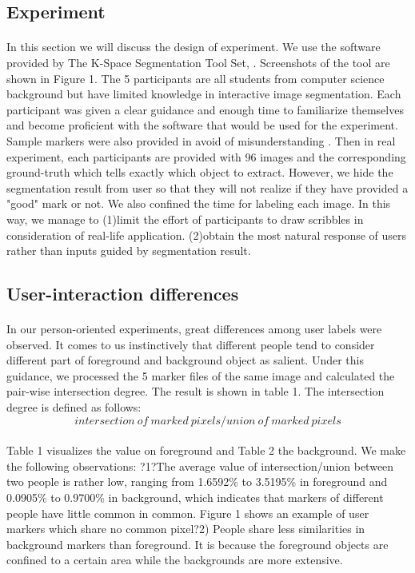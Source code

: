 \documentclass[runningheads,a4paper]{llncs}
\begin{document}
\subsection{Experiment}
\paragraph{}In this section we will discuss the design of experiment. We use the software provided by The K-Space Segmentation Tool Set, \citep{mcguinness2008k}. Screenshots of the tool are shown in Figure 1. The 5 participants are all students from computer science background but have limited knowledge in interactive image segmentation. Each participant was given a clear guidance and enough time to familiarize themselves and become proficient with the software that would be used for the experiment. Sample markers were also provided in avoid of misunderstanding . Then in real experiment, each participants are provided with 96 images and the corresponding ground-truth which tells exactly which object to extract. However, we hide the segmentation result from user so that they will not realize if they have provided a "good" mark or not. We also confined the time for labeling each image. In this way, we manage to (1)limit the effort of participants to draw scribbles in consideration of real-life application.
(2)obtain the most natural response of users rather than inputs guided by segmentation result.
\paragraph{}

\subsection{User-interaction differences}
 \paragraph{}In our person-oriented experiments, great differences among user labels were observed. It comes to us instinctively that different people tend to consider different part of foreground and background object as salient. Under this guidance, we processed the 5 marker files of the same image and calculated the pair-wise intersection degree. The result is shown in table 1. The intersection degree is defined as follows:
$$intersection\ of\ marked\ pixels/union\ of\ marked\ pixels$$

\paragraph{}Table 1 visualizes the value on foreground and Table 2 the background. We make the following observations: ?1?The average value of intersection/union between two people is rather low, ranging from 1.6592\% to 3.5195\% in foreground and 0.0905\% to 0.9700\% in background, which indicates that markers of different people have little common in common. Figure 1 shows an example of user markers which share no common pixel?2) People share less similarities in background markers than foreground. It is because the foreground objects are confined to a certain area while the backgrounds are more extensive. 
\end{document}
